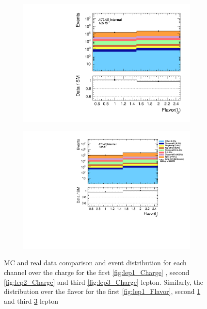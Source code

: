 \begin{figure}[H]
{\begin{subfigure}{.405\textwidth}
        \includegraphics[width=\textwidth]{Figures/FeaturesHistograms/MCvsData/lep2_Flavor.pdf}
        \caption{}
        \label{fig:lep2_Flavor}
    \end{subfigure}
    \hfill
    \begin{subfigure}{.525\textwidth}
        \includegraphics[width=\textwidth]{Figures/FeaturesHistograms/MCvsData/lep3_Flavor.pdf}
        \caption{}
        \label{fig:lep3_Flavor}
    \end{subfigure}
    }
    \caption{\ac{MC} and real data comparison and event distribution for each channel over the charge for the first \ref{fig:lep1_Charge}
    , second \ref{fig:lep2_Charge} and third \ref{fig:lep3_Charge} lepton. Similarly, the distribution over the flavor
    for the first \ref{fig:lep1_Flavor}, second \ref{fig:lep2_Flavor} and third \ref{fig:lep3_Flavor} lepton}
\end{figure}
